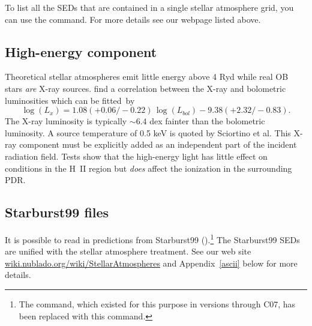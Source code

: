 To list all the SEDs that are contained in a single stellar atmosphere
grid, you can use the  command. For more
details see our webpage listed above.

\subsection{High-energy component}
\label{sec:StarHighEnergyComponent}

Theoretical stellar atmospheres emit little energy above 4 Ryd while
real OB stars \emph{are} X-ray sources.
\citet{Sciortino1990} find a correlation
between the X-ray and bolometric luminosities which can be fitted~by
\begin{equation}
\log \left( {L_x } \right) = 1.08\left( { + 0.06/ - 0.22} \right)\,\log
\left( {L_{bol} } \right) - 9.38\left( { + 2.32/ - 0.83} \right) .%
\end{equation}
The X-ray luminosity is typically $\sim 6.4$ dex fainter
than the bolometric luminosity.
A source temperature of 0.5 keV is quoted by Sciortino et al.
This X-ray component must be explicitly added as an
independent part of the incident radiation field.
Tests show that the high-energy light has little effect on
conditions in the H~II region but \emph{does} affect the
ionization in the surrounding PDR.

\subsection{Starburst99 files}

It is possible to read in predictions from Starburst99 
(\citealp{Leitherer1999}).\footnote{The  command, 
which existed for this purpose in versions through C07, has been replaced
with this   command.}
The Starburst99 SEDs are unified with the stellar
atmosphere treatment.
See our web site
\href{http://gitlab.nublado.org/cloudy/cloudy/-/wikis/StellarAtmospheres}{wiki.nublado.org/wiki/StellarAtmospheres} and
Appendix~\ref{ascii} below for more details.

